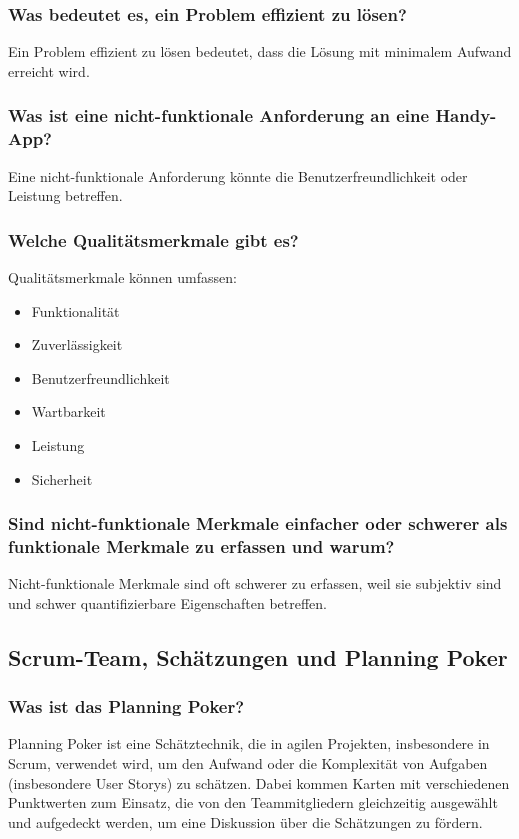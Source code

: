 \documentclass[main.tex]{subfiles}
\begin{document}
\subsubsection*{Was bedeutet es, ein Problem effizient zu lösen?}
Ein Problem effizient zu lösen bedeutet, dass die Lösung mit minimalem Aufwand erreicht wird. %


\subsubsection*{Was ist eine nicht-funktionale Anforderung an eine Handy-App?}
Eine nicht-funktionale Anforderung könnte die Benutzerfreundlichkeit oder Leistung betreffen.


\subsubsection*{Welche Qualitätsmerkmale gibt es?}
Qualitätsmerkmale können umfassen:
\begin{itemize}
    \item Funktionalität
    \item Zuverlässigkeit
    \item Benutzerfreundlichkeit
    \item Wartbarkeit
    \item Leistung
    \item Sicherheit
\end{itemize}

\subsubsection*{Sind nicht-funktionale Merkmale einfacher oder schwerer als funktionale Merkmale zu erfassen und warum?}
Nicht-funktionale Merkmale sind oft schwerer zu erfassen, weil sie subjektiv sind und schwer quantifizierbare Eigenschaften betreffen.



\subsection{Scrum-Team, Schätzungen und \gls{Planning Poker}}
\subsubsection*{Was ist das \gls{Planning Poker}?}
\gls{Planning Poker} ist eine Schätztechnik, die in agilen Projekten, insbesondere in Scrum, verwendet wird, um den Aufwand oder die Komplexität von Aufgaben (insbesondere \glspl{User Story}) zu schätzen. Dabei kommen Karten mit verschiedenen Punktwerten zum Einsatz, die von den Teammitgliedern gleichzeitig ausgewählt und aufgedeckt werden, um eine Diskussion über die Schätzungen zu fördern.
\end{document}
